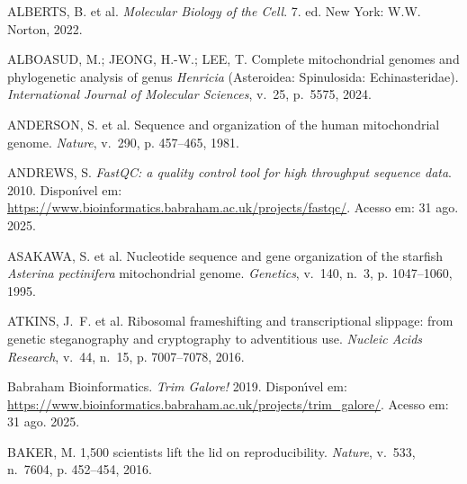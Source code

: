 \providecommand{\abntreprintinfo}[1]{%
 \citeonline{#1}}
\setlength{\labelsep}{0pt}\begin{thebibliography}{}
\providecommand{\abntrefinfo}[3]{}
\providecommand{\abntbstabout}[1]{}
\abntbstabout{v-1.9.7 }

\abntrefinfo{Alberts et al.}{ALBERTS et al.}{2022}
{ALBERTS, B. et al. \emph{Molecular Biology of the Cell}. 7. ed. New York: W.W.
  Norton, 2022.}

\abntrefinfo{Alboasud, Jeong e Lee}{ALBOASUD; JEONG; LEE}{2024}
{ALBOASUD, M.; JEONG, H.-W.; LEE, T. Complete mitochondrial genomes and
  phylogenetic analysis of genus \textit{Henricia} ({A}steroidea:
  {S}pinulosida: {E}chinasteridae).
\emph{International Journal of Molecular Sciences}, v.~25, p.~5575, 2024.}

\abntrefinfo{Anderson et al.}{ANDERSON et al.}{1981}
{ANDERSON, S. et al. Sequence and organization of the human mitochondrial
  genome.
\emph{Nature}, v.~290, p. 457--465, 1981.}

\abntrefinfo{Andrews}{ANDREWS}{2010}
{ANDREWS, S. \emph{{FastQC}: a quality control tool for high throughput
  sequence data}. 2010.
Dispon{\'\i}vel em:
  \url{https://www.bioinformatics.babraham.ac.uk/projects/fastqc/}. Acesso em:
  31 ago. 2025.}

\abntrefinfo{Asakawa et al.}{ASAKAWA et al.}{1995}
{ASAKAWA, S. et al. Nucleotide sequence and gene organization of the starfish
  \textit{Asterina pectinifera} mitochondrial genome.
\emph{Genetics}, v.~140, n.~3, p. 1047--1060, 1995.}

\abntrefinfo{Atkins et al.}{ATKINS et al.}{2016}
{ATKINS, J.~F. et al. Ribosomal frameshifting and transcriptional slippage:
  from genetic steganography and cryptography to adventitious use.
\emph{Nucleic Acids Research}, v.~44, n.~15, p. 7007--7078, 2016.}

\abntrefinfo{{Babraham Bioinformatics}}{{Babraham Bioinformatics}}{2019}
{{Babraham Bioinformatics}. \emph{{Trim Galore!}} 2019.
Dispon{\'\i}vel em:
  \url{https://www.bioinformatics.babraham.ac.uk/projects/trim\_galore/}.
  Acesso em: 31 ago. 2025.}

\abntrefinfo{Baker}{BAKER}{2016}
{BAKER, M. 1,500 scientists lift the lid on reproducibility.
\emph{Nature}, v.~533, n.~7604, p. 452--454, 2016.}


\end{thebibliography}
